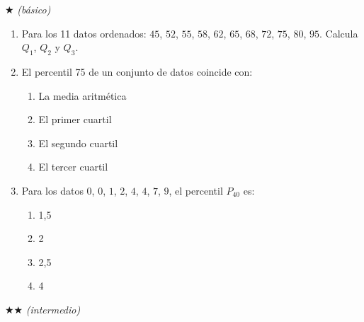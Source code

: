 \documentclass[11pt, letterpaper]{article}
\begin{document}
$\bigstar$ \textit{(básico)}

\begin{enumerate}[label=\textbf{\arabic*.}, leftmargin=*]
  \item Para los 11 datos ordenados: $45$, $52$, $55$, $58$, $62$, $65$, $68$, $72$, $75$, $80$, $95$. Calcula $Q_1$, $Q_2$ y $Q_3$.
  \vspace{2.8cm}

  \item El percentil 75 de un conjunto de datos coincide con:
  \begin{enumerate}[label=\Alph*),leftmargin=14pt]
    \item La media aritmética
    \item El primer cuartil
    \item El segundo cuartil
    \item El tercer cuartil
  \end{enumerate}

  \item Para los datos $0$, $0$, $1$, $2$, $4$, $4$, $7$, $9$, el percentil $P_{40}$ es:
  \begin{enumerate}[label=\Alph*),leftmargin=14pt]
    \item 1{,}5
    \item 2
    \item 2{,}5
    \item 4
  \end{enumerate}
\end{enumerate}

$\bigstar\bigstar$ \textit{(intermedio)}
\end{document}
